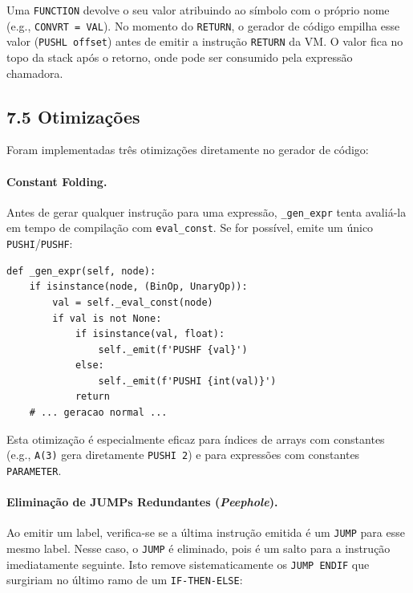 \documentclass[a4paper]{article}
\begin{document}
\vspace{0.2cm}

\noindent Uma \texttt{FUNCTION} devolve o seu valor atribuindo ao símbolo com o próprio nome (e.g., \texttt{CONVRT = VAL}). No momento do \texttt{RETURN}, o gerador de código empilha esse valor (\texttt{PUSHL offset}) antes de emitir a instrução \texttt{RETURN} da VM. O valor fica no topo da stack após o retorno, onde pode ser consumido pela expressão chamadora.

\subsection*{7.5 Otimizações}

\noindent Foram implementadas três otimizações diretamente no gerador de código:

\paragraph{Constant Folding.} Antes de gerar qualquer instrução para uma expressão, \texttt{\_gen\_expr} tenta avaliá-la em tempo de compilação com \texttt{eval\_const}. Se for possível, emite um único \texttt{PUSHI}/\texttt{PUSHF}:

\vspace{0.2cm}

\begin{lstlisting}[style=py]
def _gen_expr(self, node):
    if isinstance(node, (BinOp, UnaryOp)):
        val = self._eval_const(node)
        if val is not None:
            if isinstance(val, float):
                self._emit(f'PUSHF {val}')
            else:
                self._emit(f'PUSHI {int(val)}')
            return
    # ... geracao normal ...
\end{lstlisting}

\vspace{0.2cm}

\noindent Esta otimização é especialmente eficaz para índices de arrays com constantes (e.g., \texttt{A(3)} gera diretamente \texttt{PUSHI 2}) e para expressões com constantes \texttt{PARAMETER}.

\paragraph{Eliminação de JUMPs Redundantes (\textit{Peephole}).} Ao emitir um label, verifica-se se a última instrução emitida é um \texttt{JUMP} para esse mesmo label. Nesse caso, o \texttt{JUMP} é eliminado, pois é um salto para a instrução imediatamente seguinte. Isto remove sistematicamente os \texttt{JUMP ENDIF} que surgiriam no último ramo de um \texttt{IF-THEN-ELSE}:
\end{document}
